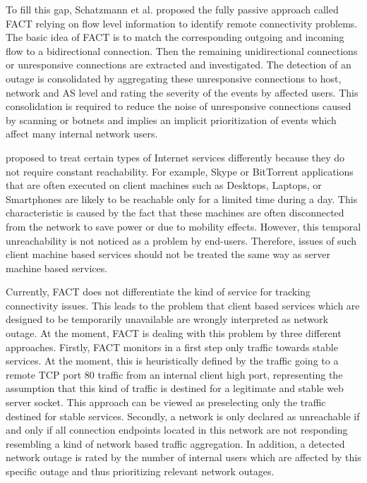 To fill this gap, Schatzmann et al. proposed the fully passive approach called
FACT \citep{SchatzmannPAM2011} relying on flow level information to identify
remote connectivity problems. The basic idea of FACT is to match the
corresponding outgoing and incoming flow to a bidirectional connection. Then the
remaining unidirectional connections or unresponsive connections are extracted
and investigated. The detection of an outage is consolidated by aggregating
these unresponsive connections to host, network and AS level and rating the
severity of the events by affected users. This consolidation is required to
reduce the noise of unresponsive connections caused by scanning or botnets and
implies an implicit prioritization of events which affect many internal network
users.

\citet{SchatzmanThesis2012} proposed to treat certain types of Internet
services differently because they do not require constant reachability. For
example, Skype or BitTorrent applications that are often executed on client
machines such as Desktops, Laptops, or Smartphones are likely to be reachable
only for a limited time during a day.
This characteristic is caused by the fact that these machines are often
disconnected from the network to save power or due to mobility effects. However, 
this temporal unreachability is not noticed as a problem by end-users. 
Therefore, issues of such client machine based services should not be treated 
the same way as server machine based services.

Currently, FACT does not differentiate the kind of service for tracking 
connectivity issues. This leads to the problem that client based services which 
are designed to be temporarily unavailable are wrongly interpreted as network 
outage. At the moment, FACT is dealing with this problem by three different 
approaches. 
Firstly, FACT monitors in a first step only traffic towards stable services. At  
the moment, this is heuristically defined by the traffic going to a remote TCP 
port 80 traffic from an internal client high port, representing the assumption 
that this kind of traffic is destined for a legitimate and stable web server 
socket. This approach can be viewed as preselecting only the traffic destined 
for stable services.  
Secondly, a network is only declared as unreachable if and only if all 
connection endpoints located in this network are not responding resembling a 
kind of network based traffic aggregation. 
In addition, a detected network outage is rated by the number of internal users 
which are affected by this specific outage and thus prioritizing relevant 
network outages.

